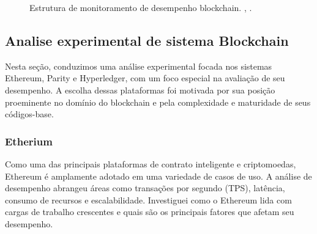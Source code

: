         \begin{figure}[H]
            \centering
            \caption{Estrutura de monitoramento de desempenho blockchain. \cite{9129732}, .}
            \label{Estrutura de monitoramento}
        \end{figure}
    \subsection{Analise experimental de sistema Blockchain}

    Nesta seção, conduzimos uma análise experimental focada nos sistemas Ethereum, Parity e Hyperledger, com um foco especial na avaliação de seu desempenho. A escolha dessas plataformas foi motivada por sua posição proeminente no domínio do blockchain e pela complexidade e maturidade de seus códigos-base.\cite{comparative-testing}

    \subsubsection{ Etherium }

     Como uma das principais plataformas de contrato inteligente e criptomoedas, Ethereum é amplamente adotado em uma variedade de casos de uso. A  análise de desempenho abrangeu áreas como transações por segundo (TPS), latência, consumo de recursos e escalabilidade. Investiguei como o Ethereum lida com cargas de trabalho crescentes e quais são os principais fatores que afetam seu desempenho.
     
